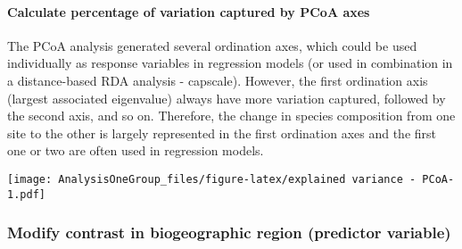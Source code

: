 \documentclass[]{article}
\newenvironment{Shaded}{\begin{snugshade}}{\end{snugshade}}
\newcommand{\CommentTok}[1]{\textcolor[rgb]{0.56,0.35,0.01}{\textit{#1}}}
\newcommand{\DataTypeTok}[1]{\textcolor[rgb]{0.13,0.29,0.53}{#1}}
\newcommand{\DecValTok}[1]{\textcolor[rgb]{0.00,0.00,0.81}{#1}}
\newcommand{\KeywordTok}[1]{\textcolor[rgb]{0.13,0.29,0.53}{\textbf{#1}}}
\newcommand{\NormalTok}[1]{#1}
\newcommand{\OperatorTok}[1]{\textcolor[rgb]{0.81,0.36,0.00}{\textbf{#1}}}
\newcommand{\StringTok}[1]{\textcolor[rgb]{0.31,0.60,0.02}{#1}}
\let\oldparagraph\paragraph
\renewcommand{\paragraph}[1]{\oldparagraph{#1}\mbox{}}
\begin{document}
\hypertarget{calculate-percentage-of-variation-captured-by-pcoa-axes}{%
\paragraph{Calculate percentage of variation captured by PCoA
axes}\label{calculate-percentage-of-variation-captured-by-pcoa-axes}}

The PCoA analysis generated several ordination axes, which could be used
individually as response variables in regression models (or used in
combination in a distance-based RDA analysis - capscale). However, the
first ordination axis (largest associated eigenvalue) always have more
variation captured, followed by the second axis, and so on. Therefore,
the change in species composition from one site to the other is largely
represented in the first ordination axes and the first one or two are
often used in regression models.

\begin{Shaded}
\end{Shaded}

\texttt{[image: AnalysisOneGroup\_files/figure-latex/explained variance - PCoA-1.pdf]}

\hypertarget{modify-contrast-in-biogeographic-region-predictor-variable}{%
\subsubsection{Modify contrast in biogeographic region (predictor
variable)}\label{modify-contrast-in-biogeographic-region-predictor-variable}}
\end{document}
